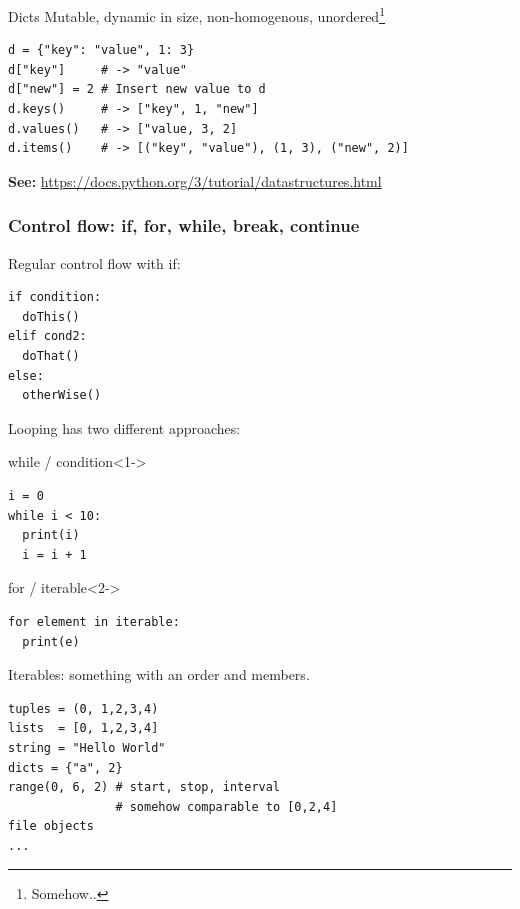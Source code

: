 \documentclass{beamer}
\begin{document}
\begin{frame}[fragile]
	
	\begin{block}{Dicts}
	Mutable, dynamic in size, non-homogenous, unordered\footnote{Somehow..}
	\begin{verbatim}
d = {"key": "value", 1: 3}
d["key"]     # -> "value"
d["new"] = 2 # Insert new value to d
d.keys()     # -> ["key", 1, "new"]
d.values()   # -> ["value, 3, 2]
d.items()    # -> [("key", "value"), (1, 3), ("new", 2)]
	\end{verbatim}
	\end{block}
\textbf{See: } \url{https://docs.python.org/3/tutorial/datastructures.html}
\end{frame}

\begin{frame}[fragile]
	\frametitle{Control flow: if, for, while, break, continue}
	Regular control flow with if:
	\begin{verbatim}
if condition:
  doThis()
elif cond2:
  doThat()
else:
  otherWise()
	\end{verbatim}
\end{frame}

\begin{frame}[fragile]
Looping has two different approaches:
\begin{block}{while / condition}<1->
	\begin{verbatim}
i = 0
while i < 10:
  print(i)
  i = i + 1
	\end{verbatim}
\end{block} 
\begin{block}{for / iterable}<2->
	\begin{verbatim}
for element in iterable:
  print(e)
	\end{verbatim}
\end{block} 
\end{frame}

\begin{frame}[fragile]
Iterables: something with an order and members.
\begin{example}
	\begin{verbatim}
tuples = (0, 1,2,3,4)
lists  = [0, 1,2,3,4]
string = "Hello World"
dicts = {"a", 2}  
range(0, 6, 2) # start, stop, interval
               # somehow comparable to [0,2,4]
file objects
...
	\end{verbatim}
\end{example}
\end{frame}
\end{document}
